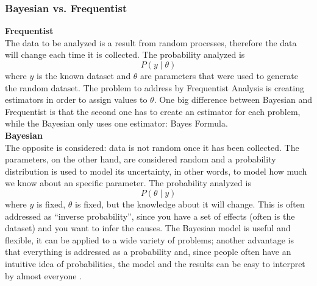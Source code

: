   \subsubsection{Bayesian vs. Frequentist}
  	\textbf{Frequentist}\\ The data to be analyzed is a result from random processes, therefore the data will change each time it is collected. The probability analyzed is
	\begin{equation*}
		P(y\mid\theta)
	\end{equation*}
    where $y$ is the known dataset and $\theta$ are parameters that were used to generate the random dataset. The problem to address by Frequentist Analysis is creating estimators in order to assign values to $\theta$. One big difference between Bayesian and Frequentist is that the second one has to create an estimator for each problem, while the Bayesian only uses one estimator: Bayes Formula.\\
    \textbf{Bayesian}\\ The opposite is considered: data is not random once it has been collected. The parameters, on the other hand, are considered random and a probability distribution is used to model its uncertainty, in other words, to model how much we know about an specific parameter. The probability analyzed is
    \begin{equation*}
    	P(\theta\mid y)
    \end{equation*}
    where $y$ is fixed, $\theta$ is fixed, but the knowledge about it will change. This is often addressed as ``inverse probability'', since you have a set of effects (often is the dataset) and you want to infer the causes. The Bayesian model is useful and flexible, it can be applied to a wide variety of problems; another advantage is that everything is addressed as a probability and, since people often have an intuitive idea of probabilities, the model and the results can be easy to interpret by almost everyone \cite{youtube1}.


